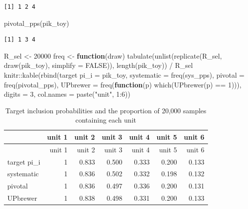 \documentclass[
  letterpaper,
  DIV=11,
  numbers=noendperiod]{scrreprt}
\newenvironment{Shaded}{\begin{snugshade}}{\end{snugshade}}
\newcommand{\AttributeTok}[1]{\textcolor[rgb]{0.40,0.45,0.13}{#1}}
\newcommand{\ConstantTok}[1]{\textcolor[rgb]{0.56,0.35,0.01}{#1}}
\newcommand{\ControlFlowTok}[1]{\textcolor[rgb]{0.00,0.23,0.31}{\textbf{#1}}}
\newcommand{\DecValTok}[1]{\textcolor[rgb]{0.68,0.00,0.00}{#1}}
\newcommand{\FunctionTok}[1]{\textcolor[rgb]{0.28,0.35,0.67}{#1}}
\newcommand{\NormalTok}[1]{\textcolor[rgb]{0.00,0.23,0.31}{#1}}
\newcommand{\OtherTok}[1]{\textcolor[rgb]{0.00,0.23,0.31}{#1}}
\newcommand{\SpecialCharTok}[1]{\textcolor[rgb]{0.37,0.37,0.37}{#1}}
\newcommand{\StringTok}[1]{\textcolor[rgb]{0.13,0.47,0.30}{#1}}
\renewcommand{\[}{\begin{equation}}
\renewcommand{\]}{\end{equation}}
\begin{document}
\begin{verbatim}
[1] 1 2 4
\end{verbatim}

\begin{Shaded}
\begin{Highlighting}[]
\FunctionTok{pivotal\_pps}\NormalTok{(pik\_toy)}
\end{Highlighting}
\end{Shaded}

\begin{verbatim}
[1] 1 3 4
\end{verbatim}

\begin{Shaded}
\begin{Highlighting}[]
\NormalTok{R\_sel }\OtherTok{\textless{}{-}} \DecValTok{20000}
\NormalTok{freq }\OtherTok{\textless{}{-}} \ControlFlowTok{function}\NormalTok{(draw) }\FunctionTok{tabulate}\NormalTok{(}\FunctionTok{unlist}\NormalTok{(}\FunctionTok{replicate}\NormalTok{(R\_sel, }\FunctionTok{draw}\NormalTok{(pik\_toy), }\AttributeTok{simplify =} \ConstantTok{FALSE}\NormalTok{)), }\FunctionTok{length}\NormalTok{(pik\_toy)) }\SpecialCharTok{/}\NormalTok{ R\_sel}
\NormalTok{knitr}\SpecialCharTok{::}\FunctionTok{kable}\NormalTok{(}\FunctionTok{rbind}\NormalTok{(}\StringTok{\textasciigrave{}}\AttributeTok{target pi\_i}\StringTok{\textasciigrave{}} \OtherTok{=}\NormalTok{ pik\_toy, }\AttributeTok{systematic =} \FunctionTok{freq}\NormalTok{(sys\_pps), }\AttributeTok{pivotal =} \FunctionTok{freq}\NormalTok{(pivotal\_pps),}
                   \StringTok{\textasciigrave{}}\AttributeTok{UPbrewer}\StringTok{\textasciigrave{}} \OtherTok{=} \FunctionTok{freq}\NormalTok{(}\ControlFlowTok{function}\NormalTok{(p) }\FunctionTok{which}\NormalTok{(}\FunctionTok{UPbrewer}\NormalTok{(p) }\SpecialCharTok{==} \DecValTok{1}\NormalTok{))),}
             \AttributeTok{digits =} \DecValTok{3}\NormalTok{, }\AttributeTok{col.names =} \FunctionTok{paste}\NormalTok{(}\StringTok{"unit"}\NormalTok{, }\DecValTok{1}\SpecialCharTok{:}\DecValTok{6}\NormalTok{))}
\end{Highlighting}
\end{Shaded}

\begin{longtable}[]{@{}lrrrrrr@{}}
\caption{Target inclusion probabilities and the proportion of 20,000
samples containing each unit}\tabularnewline
\toprule\noalign{}
& unit 1 & unit 2 & unit 3 & unit 4 & unit 5 & unit 6 \\
\midrule\noalign{}
\endfirsthead
\toprule\noalign{}
& unit 1 & unit 2 & unit 3 & unit 4 & unit 5 & unit 6 \\
\midrule\noalign{}
\endhead
\bottomrule\noalign{}
\endlastfoot
target pi\_i & 1 & 0.833 & 0.500 & 0.333 & 0.200 & 0.133 \\
systematic & 1 & 0.836 & 0.502 & 0.332 & 0.198 & 0.132 \\
pivotal & 1 & 0.836 & 0.497 & 0.336 & 0.200 & 0.131 \\
UPbrewer & 1 & 0.838 & 0.498 & 0.331 & 0.200 & 0.133 \\
\end{longtable}
\end{document}
